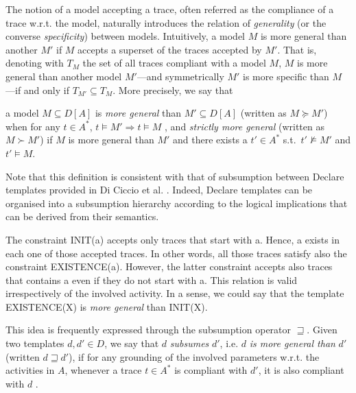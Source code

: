  The notion of a model accepting a trace, often referred as the compliance of a trace w.r.t. the model, naturally introduces the relation of \emph{generality} (or the converse \emph{specificity}) between models.
%
Intuitively, a model $M$ is more general than another $M'$ if $M$ accepts a superset of the traces accepted by $M'$. That is, denoting with $T_M$ the set of all traces compliant with a model $M$, $M$ is more general than another model $M'$---and symmetrically $M'$ is more specific than $M$---if and only if $T_{M'} \subseteq T_M$. 
%
More precisely, we say that 
\theoremstyle{definition}\label{def:generality}
\begin{definition}{}
a model $M\subseteq D[A]$ is \emph{more general} than $M'\subseteq D[A]$ (written as $M \succeq M'$) when for any $t\in A^*$, $t\models M' \Rightarrow t\models M$ , and \emph{strictly more general} (written as $M \succ M'$) if $M$ is more general than $M'$ and there exists a $t'\in A^*$ s.t.\ $t'\not\models M'$ and $t'\models M$.
\end{definition}

Note that this definition is consistent with that of subsumption between Declare templates provided in Di Ciccio et al. \cite{2017-DiCiccio}. Indeed, Declare templates can be organised into a subsumption hierarchy according to the logical implications that can be derived from their semantics.
%
\begin{example}{}
The constraint \textsf{INIT(a)} accepts only traces that start with \textsf{a}. Hence, \textsf{a} exists in each one of those accepted traces. In other words, all those traces satisfy also the constraint \textsf{EXISTENCE(a)}. However, the latter constraint accepts also traces that contains \textsf{a} even if they do not start with \textsf{a}. This relation is valid irrespectively of the involved activity. In a sense, we could say that the template \textsf{EXISTENCE(X)} is \emph{more general} than \textsf{INIT(X)}.
\end{example}
This idea is frequently expressed through the subsumption operator $\sqsupseteq$. Given two templates $d, d' \in D$, we say that $d$ \emph{subsumes} $d'$, i.e. $d$ \emph{is more general than} $d'$ (written $d\sqsupseteq d'$), if for any grounding of the involved parameters w.r.t. the activities in $A$, whenever a trace $t \in A^*$ is compliant with $d'$, it is also compliant with $d$ \cite{2017-DiCiccio} .


